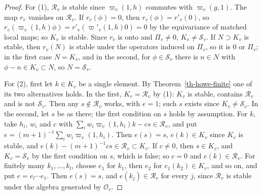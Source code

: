 \begin{proof}
For (1), $\mathcal R_v$ is stable since $\varpi_v(1,h)$ commutes with
$\varpi_v(g,1)$. The map $r_v$ vanishes on $\mathcal R_v$. If $r_v(\phi)=0$,
then $r_v(\phi)=r'_v(0)$, so
$r_v(\varpi_v(1,h)\phi)=r'_v(\varpi'_v(1,h)0)=0$ by the equivariance of
matched local maps; so $K_v$ is stable. Since $r_v$ is onto and
$\Pi_v\neq0$, $K_v\neq\mathcal S_v$. If $N\supset K_v$ is stable, then
$r_v(N)$ is stable under the operators induced on $\Pi_v$, so it is $0$ or
$\Pi_v$; in the first case $N=K_v$, and in the second, for $\phi\in\mathcal
S_v$ there is $n\in N$ with $\phi-n\in K_v\subset N$, so $N=\mathcal S_v$.

For (2), first let $k\in K_v$ be a single element. By
Theorem~\ref{th-howe-finite} one of its two alternatives holds. In the first,
$K_v=\mathcal R_v$ by (1): $K_v$ is stable, contains $\mathcal R_v$ and is
not $\mathcal S_v$. Then any $s\notin\mathcal R_v$ works, with $e=1$; such
$s$ exists since $K_v\neq\mathcal S_v$. In the second, let $s$ be as there;
the first condition on $s$ holds by assumption. For $k$, take $h_i$, $w_i$
and $c$ with $\sum_iw_i\varpi_v(1,h_i)k-cs\in\mathcal R_v$, and put
$e=(m+1)^{-1}\sum_iw_i\varpi_v(1,h_i)$. Then $e(s)=s$, $e(k)\in K_v$ since
$K_v$ is stable, and $e(k)-(m+1)^{-1}cs\in\mathcal R_v\subset K_v$. If
$c\neq0$, then $s\in K_v$, and $K_v=\mathcal S_v$ by the first condition on
$s$, which is false; so $c=0$ and $e(k)\in\mathcal R_v$. For finitely many
$k_1,\ldots,k_l$, choose $e_1$ for $k_1$, then $e_2$ for $e_1(k_2)\in K_v$,
and so on, and put $e=e_l\cdots e_1$. Then $e(s)=s$, and $e(k_j)\in\mathcal
R_v$ for every $j$, since $\mathcal R_v$ is stable under the algebra
generated by $\mathcal O_v$.
\end{proof}


